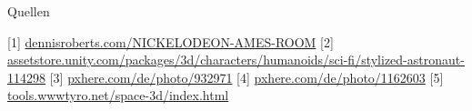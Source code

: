 \documentclass{beamer}
\begin{document}
\begin{frame}{Quellen}
	\begin{thebibliography}{10}
[1]{ \url{dennisroberts.com/NICKELODEON-AMES-ROOM}
}
[2]{ \url{assetstore.unity.com/packages/3d/characters/humanoids/sci-fi/stylized-astronaut-114298}
}
[3]{ \url{pxhere.com/de/photo/932971}
}
[4]{ \url{pxhere.com/de/photo/1162603}
}
[5]{ \url{tools.wwwtyro.net/space-3d/index.html}}
\end{thebibliography}
\end{frame}


	
    	
    	
    	
\end{document}
